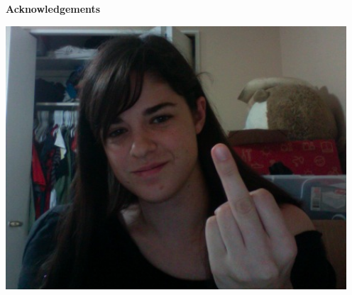 \begin{center}\textbf{Acknowledgements}\end{center}
\begin{center}
\includegraphics[width=5in]{./figures/made/Picture4.png}
\end{center}

\cleardoublepage

%
%

\tableofcontents
\cleardoublepage


\listoffigures
{}
\cleardoublepage



